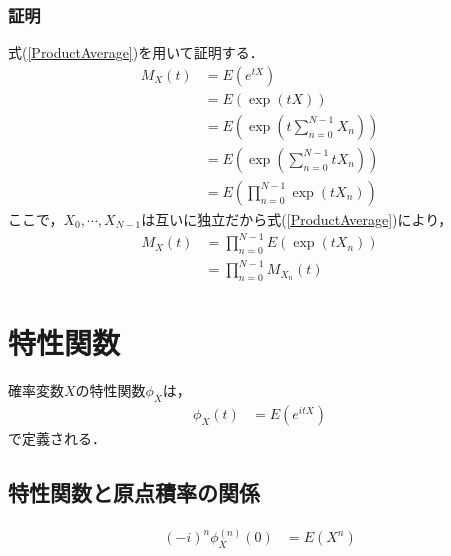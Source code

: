 \documentclass[dvipdfmx]{jsarticle}
\begin{document}
 \subsubsection{証明}
式(\ref{ProductAverage})を用いて証明する．
 \begin{align}
  M_X\left(t\right)&=E\left(e^{tX}\right)\nonumber\\
  &=E\left(\exp\left(tX\right)\right)\nonumber\\
  &=E\left(\exp\left(t\sum_{n=0}^{N-1}X_n\right)\right)\nonumber\\
  &=E\left(\exp\left(\sum_{n=0}^{N-1}tX_n\right)\right)\nonumber\\
  &=E\left(\prod_{n=0}^{N-1}\exp\left(tX_n\right)\right)\nonumber
 \end{align}
ここで，$X_0,\cdots,X_{N-1}$は互いに独立だから式(\ref{ProductAverage})により，
 \begin{align}
  M_X\left(t\right)&=\prod_{n=0}^{N-1}E\left(\exp\left(tX_n\right)\right)\nonumber\\
  &=\prod_{n=0}^{N-1}M_{X_n}\left(t\right)
 \end{align}
 \section{特性関数}
確率変数$X$の特性関数$\phi_X$は，
 \begin{align}
  \phi_X\left(t\right)&=E\left(e^{itX}\right)
 \end{align}
で定義される．
 \subsection{特性関数と原点積率の関係}
 \begin{align}
  \left(-i\right)^n\phi_X^{\left(n\right)}\left(0\right)&=E\left(X^n\right)
 \end{align}
\end{document}
